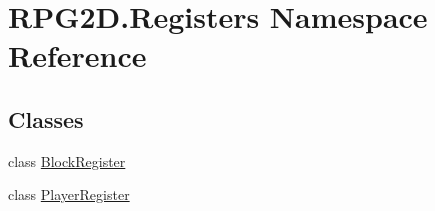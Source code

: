 \hypertarget{namespace_r_p_g2_d_1_1_registers}{}\section{R\+P\+G2\+D.\+Registers Namespace Reference}
\label{namespace_r_p_g2_d_1_1_registers}
\subsection*{Classes}
\begin{DoxyCompactItemize}
\item 
class \mbox{\hyperlink{class_r_p_g2_d_1_1_registers_1_1_block_register}{Block\+Register}}
\item 
class \mbox{\hyperlink{class_r_p_g2_d_1_1_registers_1_1_player_register}{Player\+Register}}
\end{DoxyCompactItemize}
